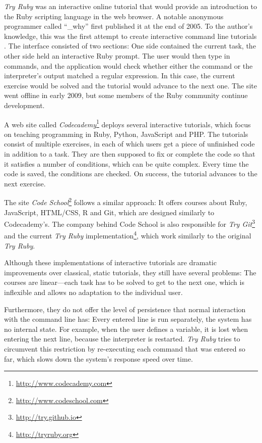 \documentclass[paper=a4,twoside,abstract=on,cleardoublepage=empty,numbers=noenddot,toc=bib,12pt,appendixprefix=true]{scrreprt}
\begin{document}
\emph{Try Ruby} was an interactive online tutorial that would provide an introduction to the Ruby scripting language in the web browser. A notable anonymous programmer called “\_why” first published it at the end of 2005. To the author's knowledge, this was the first attempt to create interactive command line tutorials \cite{why05}. The interface consisted of two sections: One side contained the current task, the other side held an interactive Ruby prompt. The user would then type in commands, and the application would check whether either the command or the interpreter's output matched a regular expression. In this case, the current exercise would be solved and the tutorial would advance to the next one.
The site went offline in early 2009, but some members of the Ruby community continue development.

A web site called \emph{Codecademy}\footnote{\url{http://www.codecademy.com}} deploys several interactive tutorials, which focus on teaching programming in Ruby, Python, JavaScript and PHP. The tutorials consist of multiple exercises, in each of which users get a piece of unfinished code in addition to a task. They are then supposed to fix or complete the code so that it satisfies a number of conditions, which can be quite complex. Every time the code is saved, the conditions are checked. On success, the tutorial advances to the next exercise.

The site \emph{Code School}\footnote{\url{http://www.codeschool.com}} follows a similar approach: It offers courses about Ruby, JavaScript, HTML/CSS, R and Git, which are designed similarly to Codecademy's. The company behind Code School is also responsible for \emph{Try Git}\footnote{\url{http://try.github.io}} and the current \emph{Try Ruby} implementation\footnote{\url{http://tryruby.org}}, which work similarly to the original \emph{Try Ruby}.

Although these implementations of interactive tutorials are dramatic improvements over classical, static tutorials, they still have several problems: The courses are linear---each task has to be solved to get to the next one, which is inflexible and allows no adaptation to the individual user.

Furthermore, they do not offer the level of persistence that normal interaction with the command line has: Every entered line is run separately, the system has no internal state. For example, when the user defines a variable, it is lost when entering the next line, because the interpreter is restarted. \emph{Try Ruby} tries to circumvent this restriction by re-executing each command that was entered so far, which slows down the system's response speed over time.
\end{document}
